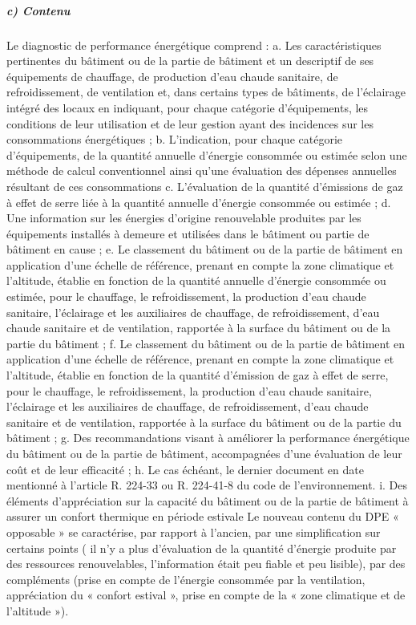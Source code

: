 			\subparagraph{c) Contenu}
			
			Le diagnostic de performance énergétique comprend :
			a. Les caractéristiques pertinentes du bâtiment ou de la partie de bâtiment et un descriptif de ses équipements de chauffage, de production d'eau chaude sanitaire, de refroidissement, de ventilation et, dans certains types de bâtiments, de l'éclairage intégré des locaux en indiquant, pour chaque catégorie d'équipements, les conditions de leur utilisation et de leur gestion ayant des incidences sur les consommations énergétiques ;
			b. L'indication, pour chaque catégorie d'équipements, de la quantité annuelle d'énergie consommée ou estimée selon une méthode de calcul conventionnel ainsi qu'une évaluation des dépenses annuelles résultant de ces consommations
			c. L'évaluation de la quantité d'émissions de gaz à effet de serre liée à la quantité annuelle d'énergie consommée ou estimée ;
			d. Une information sur les énergies d'origine renouvelable produites par les équipements installés à demeure et utilisées dans le bâtiment ou partie de bâtiment en cause ;
			e. Le classement du bâtiment ou de la partie de bâtiment en application d'une échelle de référence, prenant en compte la zone climatique et l’altitude, établie en fonction de la quantité annuelle d'énergie consommée ou estimée, pour le chauffage, le refroidissement, la production d'eau chaude sanitaire, l’éclairage et les auxiliaires de chauffage, de refroidissement, d'eau chaude sanitaire et de ventilation, rapportée à la surface du bâtiment ou de la partie du bâtiment ;
			f. Le classement du bâtiment ou de la partie de bâtiment en application d'une échelle de référence, prenant en compte la zone climatique et l’altitude, établie en fonction de la quantité d’émission de gaz à effet de serre, pour le chauffage, le refroidissement, la production d'eau chaude sanitaire, l’éclairage et les auxiliaires de chauffage, de refroidissement, d'eau chaude sanitaire et de ventilation, rapportée à la surface du bâtiment ou de la partie du bâtiment ;
			g. Des recommandations visant à améliorer la performance énergétique du bâtiment ou de la partie de bâtiment, accompagnées d'une évaluation de leur coût et de leur efficacité ;
			h. Le cas échéant, le dernier document en date mentionné à l'article R. 224-33 ou R. 224-41-8 du code de l'environnement.
			i. Des éléments d’appréciation sur la capacité du bâtiment ou de la partie de bâtiment à assurer un confort thermique en période estivale
			Le nouveau contenu du DPE « opposable » se caractérise, par rapport à l’ancien, par une simplification sur certains points ( il n’y a plus d’évaluation de la quantité d’énergie produite par des ressources renouvelables, l’information était peu fiable et peu lisible), par des compléments (prise en compte de l’énergie consommée par la ventilation, appréciation du « confort estival », prise en compte de la « zone climatique et de l’altitude »).

